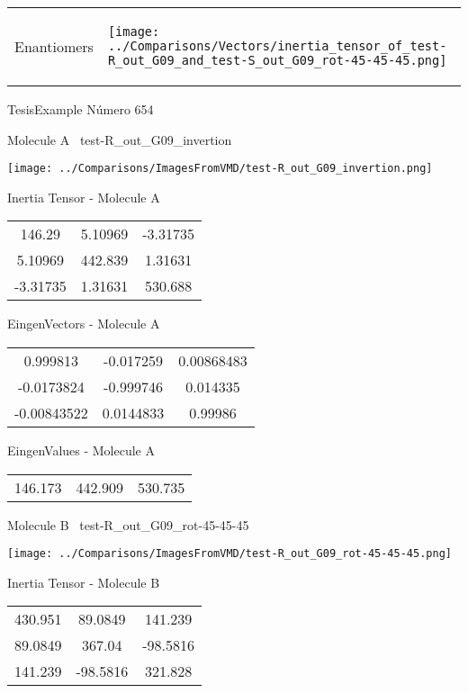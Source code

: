\vtab[-5mm]
\begin{tabular}{*{2}{m{}}}
\begin{center}
\textcolor{NavyBlue}{\Large Enantiomers}
\end{center}
&
\begin{center}
\texttt{[image: ../Comparisons/Vectors/inertia\_tensor\_of\_test-R\_out\_G09\_and\_test-S\_out\_G09\_rot-45-45-45.png]}
\end{center}
\end{tabular}

 \newpage

\vtab[-3cm]
\begin{center}
{\large TesisExample \tab Número 654}
\end{center}
\begin{multicols}{2}
\begin{center}

Molecule A \
test-R\_out\_G09\_invertion

\texttt{[image: ../Comparisons/ImagesFromVMD/test-R\_out\_G09\_invertion.png]}

Inertia Tensor - Molecule A \\
\begin{tabular}{|c c c|}
146.29	 & 	5.10969	 & 	-3.31735	 \\
5.10969	 & 	442.839	 & 	1.31631	 \\
-3.31735	 & 	1.31631	 & 	530.688
\end{tabular}

\vtab
 EingenVectors - Molecule A     \\
\begin{tabular}{|c c c|}
0.999813	 & 	-0.017259	 & 	0.00868483	 \\
-0.0173824	 & 	-0.999746	 & 	0.014335	 \\
-0.00843522	 & 	0.0144833	 & 	0.99986
\end{tabular}

\vtab
 EingenValues - Molecule A     \\
\begin{tabular}{|c c c|}
146.173	 & 	442.909	 & 	530.735	 \\
\end{tabular}
\columnbreak

Molecule B \
test-R\_out\_G09\_rot-45-45-45

\texttt{[image: ../Comparisons/ImagesFromVMD/test-R\_out\_G09\_rot-45-45-45.png]}

Inertia Tensor - Molecule B \\
\begin{tabular}{|c c c|}
430.951	 & 	89.0849	 & 	141.239	 \\
89.0849	 & 	367.04	 & 	-98.5816	 \\
141.239	 & 	-98.5816	 & 	321.828
\end{tabular}


\end{center}
\end{multicols}
